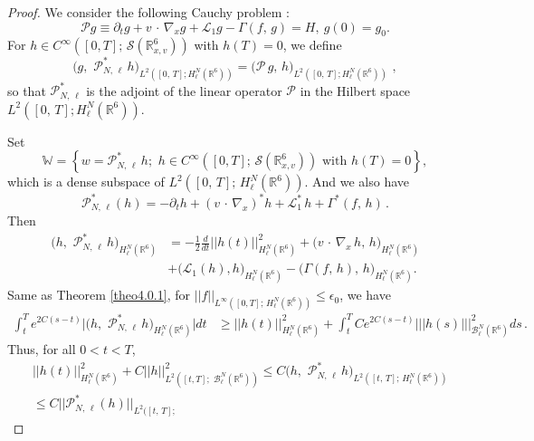 \documentclass{amsart}[12pt, article]
\begin{document}
\begin{proof}
We consider the following Cauchy problem :
\begin{equation}\label{4.1.1}
{\mathcal P} g \equiv \partial_t g + v\,\cdot\,\nabla_x g + {{\mathcal L}}_1 g
- \Gamma (f,\, g) = H , \ g(0) =g_0.
\end{equation}
For $h\in C^\infty ([0,T];\, {\mathcal S}({{{\mathbb R}}}^6_{x,v}) )$ with $h(T)
=0$, we define
$$
\Big(g,\,\, {\mathcal P}^*_{N,\,\ell} \, h\Big)_{L^2([0,\,T];
H^N_\ell({{{\mathbb R}}}^6))} = \Big({\mathcal P}\,g,\, h\Big)_{L^2([0,\,T];
H^N_\ell({{{\mathbb R}}}^6))}\,\, ,
$$
so that ${\mathcal P}^*_{N,\,\ell} $ is the adjoint of the linear operator
${\mathcal P}$ in the Hilbert space $L^2 ([0,\,T]; H^N_\ell({{{\mathbb R}}}^6)
)$.

Set
$$
{\mathbb W} = \left\{ w = {\mathcal P}^*_{N,\,\ell}\, h ;\,\,h\in
C^\infty ([0,T];\, {\mathcal S}({{{\mathbb R}}}^6_{x,v}) )\,\,\mbox{with}\,\,
h(T) =0 \right\},
$$
which  is a dense subspace of $L^2 ([0,\,T];
\,H^N_\ell({{{\mathbb R}}}^6) )$. And we also have
$$
{\mathcal P}^\ast_{N,\,\ell} (h) = -\partial_t  h +
(v\,\cdot\,\nabla_x )^\ast h + {{\mathcal L}}^\ast_1\, h + \Gamma^\ast (f,\,
h)\,.
$$
Then
\begin{align*}
\Big(h,\,\, {\mathcal P}^*_{N,\,\ell} \, h\Big)_{H^N_\ell({{{\mathbb R}}}^6)}
&=-\frac 12 \frac{d}{dt}|| h (t) ||^2_{H^N_\ell({{{\mathbb R}}}^6)} +
\Big(v\,\cdot\,\nabla_x\, h ,\, h\Big)_{
H^N_\ell({{{\mathbb R}}}^6)}\\
& + \Big({{\mathcal L}}_1  (h) , h\Big)_{H^N_\ell({{{\mathbb R}}}^6)}- \Big(\Gamma (f,\, h)
,\, h\Big)_{H^N_\ell({{{\mathbb R}}}^6)}.
\end{align*}
Same as Theorem \ref{theo4.0.1}, for
$|| f||_{L^\infty ([0, T];\, H^N_\ell({{{\mathbb R}}}^6))} \leq \epsilon_0$, we
have
\begin{align*}
\int^T_t e^{2C (s-t)}\Big|\Big(h,\,\, {\mathcal P}^*_{N,\,\ell} \,
h\Big)_{H^N_\ell({{{\mathbb R}}}^6)}\Big| dt &\geq || h(t)
||^2_{H^N_\ell({{{\mathbb R}}}^6)} + \int^T_t C e^{2C (s-t)} ||| h(s)
|||^2_{{{\mathcal B}}^N_\ell({{{\mathbb R}}}^6)} ds\, .
\end{align*}
Thus, for all $0<t<T$,
\begin{align*}
&|| h(t)||^2_{H^N_\ell({{{\mathbb R}}}^6)}+C|| h ||^2_{L^2([t,
T];\,\,{{\mathcal B}}^N_\ell({{{\mathbb R}}}^6))} \leq C\Big(h,\,\, {\mathcal
P}^*_{N,\,\ell} \,
h\Big)_{L^2([t,\,T];\, H^N_\ell({{{\mathbb R}}}^6))}\\
&\leq C || {\mathcal P}^*_{N,\,\ell} (h) ||_{L^2([t,\,T];
}
\end{align*}
\end{proof}
\end{document}
